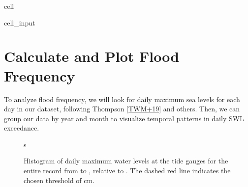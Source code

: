 \documentclass[letterpaper,10pt,english]{jupyterBook}
\begin{document}
\begin{sphinxuseclass}{cell}\begin{sphinxVerbatimInput}

\begin{sphinxuseclass}{cell_input}
\begin{sphinxVerbatim}[commandchars=\\\{\}]
\PYG{p}{[}\PYG{p}{]}  \PYG{p}{[}\PYG{p}{]}
\PYG{p}{[}\PYG{p}{]}  \PYG{p}{[}\PYG{p}{]}
\end{sphinxVerbatim}

\end{sphinxuseclass}\end{sphinxVerbatimInput}

\end{sphinxuseclass}

\part{Calculate and Plot Flood Frequency}
\label{\detokenize{notebooks/FloodFrequency:calculate-and-plot-flood-frequency}}
\sphinxAtStartPar
To analyze flood frequency, we will look for daily maximum sea levels for each day in our dataset, following Thompson  {[}\hyperlink{cite.notebooks/FloodFrequency:id4}{TWM+19}{]} and others. Then, we can group our data by year and month to visualize temporal patterns in daily SWL exceedance.

\begin{figure}[htbp]
\centering
\capstart

\noindent{}
\caption{Histogram of daily maximum water levels at the  tide gauges for the entire record from  to , relative to . The dashed red line indicates the chosen threshold of  cm.}\label{\detokenize{notebooks/FloodFrequency:fig-histogram}}
\begin{sphinxlegend}
\sphinxAtStartPar
s
\end{sphinxlegend}
\end{figure}
\end{document}
